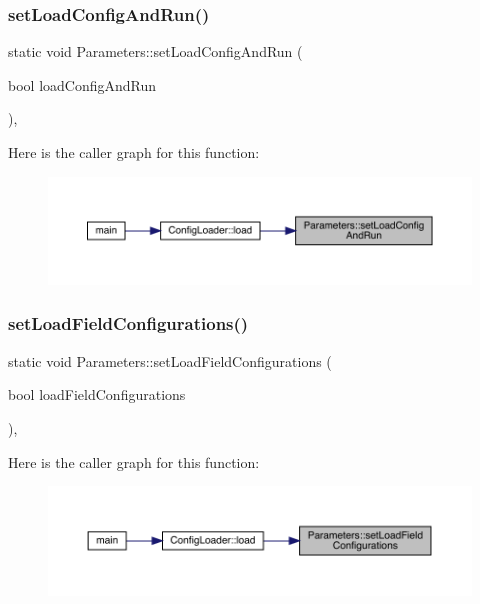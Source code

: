 \subsubsection{\texorpdfstring{setLoadConfigAndRun()}{setLoadConfigAndRun()}}
{\footnotesize\ttfamily static void Parameters\+::set\+Load\+Config\+And\+Run (\begin{DoxyParamCaption}\item[{bool}]{load\+Config\+And\+Run }\end{DoxyParamCaption})\hspace{0.3cm}{\ttfamily [inline]}, {\ttfamily [static]}}

Here is the caller graph for this function\+:\nopagebreak
\begin{figure}[H]
\begin{center}
\leavevmode
\includegraphics[width=350pt]{class_parameters_aa7e911174ec1991f6750b9774b184fd3_icgraph}
\end{center}
\end{figure}
\mbox{\label{class_parameters_a4f96947340b496b847a808b8be6fc5f9}} 
\subsubsection{\texorpdfstring{setLoadFieldConfigurations()}{setLoadFieldConfigurations()}}
{\footnotesize\ttfamily static void Parameters\+::set\+Load\+Field\+Configurations (\begin{DoxyParamCaption}\item[{bool}]{load\+Field\+Configurations }\end{DoxyParamCaption})\hspace{0.3cm}{\ttfamily [inline]}, {\ttfamily [static]}}

Here is the caller graph for this function\+:\nopagebreak
\begin{figure}[H]
\begin{center}
\leavevmode
\includegraphics[width=350pt]{class_parameters_a4f96947340b496b847a808b8be6fc5f9_icgraph}
\end{center}
\end{figure}
\mbox{\label{class_parameters_ace3967a0ee49901f55e9de69e0a96117}} 
